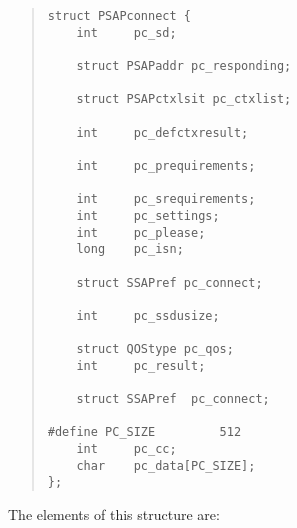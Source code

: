 \begin{quote}\small\begin{verbatim}
struct PSAPconnect {
    int     pc_sd;

    struct PSAPaddr pc_responding;

    struct PSAPctxlsit pc_ctxlist;

    int     pc_defctxresult;

    int     pc_prequirements;

    int     pc_srequirements;
    int     pc_settings;
    int     pc_please;
    long    pc_isn;

    struct SSAPref pc_connect;

    int     pc_ssdusize;

    struct QOStype pc_qos;
    int     pc_result;

    struct SSAPref  pc_connect;

#define PC_SIZE         512
    int     pc_cc;
    char    pc_data[PC_SIZE];
};
\end{verbatim}\end{quote}
The elements of this structure are:\label{PSAPconnect}
